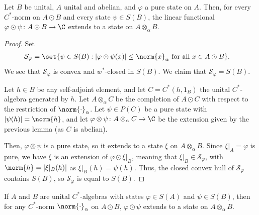\documentclass[10pt]{mypackage}
\begin{document}
\begin{lemma}
  Let $B$ be unital, $A$ unital and abelian, and $\varphi$ a pure state on $A$. Then, for every $C^{\ast}$-norm on $A\odot B$ and every state $\psi\in S(B)$, the linear functional $\varphi\odot\psi\colon A\odot B\rightarrow \C$ extends to a state on $A\otimes_{\alpha}B$.
\end{lemma}
\begin{proof}
  Set
  \begin{align*}
    \mathcal{S}_{\varphi} &= \set{\psi\in S(B) : \left\vert \varphi\odot\psi(x) \right\vert\leq \norm{x}_{\alpha}\text{ for all }x\in A\odot B}.
  \end{align*}
  We see that $\mathcal{S}_{\varphi}$ is convex and $w^{\ast}$-closed in $S(B)$. We claim that $\mathcal{S}_{\varphi} = S(B)$.

  Let $h\in B$ be any self-adjoint element, and let $C = C^{\ast}\left( h,1_B \right)$ the unital $C^{\ast}$-algebra generated by $h$. Let $A\otimes_{\alpha}C$ be the completion of $A\odot C$ with respect to the restriction of $\norm{\cdot}_{\alpha}$. Let $\psi\in P(C)$ be a pure state with $\left\vert \psi(h) \right\vert = \norm{h}$, and let $\varphi\otimes\psi\colon A\otimes_{\alpha}C\rightarrow \C$ be the extension given by the previous lemma (as $C$ is abelian).

  Then, $\varphi\otimes\psi$ is a pure state, so it extends to a state $\xi$ on $A\otimes_{\alpha}B$. Since $\xi|_{A} = \varphi$ is pure, we have $\xi$ is an extension of $\varphi\odot\xi|_{B}$, meaning that $\xi|_{B}\in \mathcal{S}_{\varphi}$, with $\norm{h} = \left\vert \xi|_{B}(h) \right\vert$ as $\xi|_{B}(h) = \psi(h)$. Thus, the closed convex hull of $\mathcal{S}_{\varphi}$ contains $S(B)$, so $\mathcal{S}_{\varphi}$ is equal to $S(B)$.
\end{proof}
\begin{proposition}
  If $A$ and $B$ are unital $C^{\ast}$-algebras with states $\varphi\in S(A)$ and $\psi\in S(B)$, then for any $C^{\ast}$-norm $\norm{\cdot}_{\alpha}$ on $A\odot B$, $\varphi\odot\psi$ extends to a state on $A\otimes_{\alpha}B$.
\end{proposition}
\end{document}
